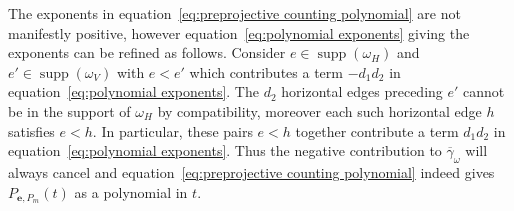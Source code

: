 \documentclass[ALCO,ThmDefs,Unicode,epreuves]{cedram}
\newcommand{\bfe}{\mathbf{e}}
\DeclareMathOperator{\supp}{supp}
\begin{document}
\begin{remark}
 The exponents in equation~\eqref{eq:preprojective counting polynomial} are not manifestly positive, however equation~\eqref{eq:polynomial exponents} giving the exponents can be refined as follows.
 Consider $e\in\supp(\omega_H)$ and $e'\in\supp(\omega_V)$ with $e<e'$ which contributes a term $-d_1d_2$ in equation~\eqref{eq:polynomial exponents}.
 The $d_2$ horizontal edges preceding $e'$ cannot be in the support of $\omega_H$ by compatibility, moreover each such horizontal edge $h$ satisfies $e<h$.
 In particular, these pairs $e<h$ together contribute a term $d_1d_2$ in equation~\eqref{eq:polynomial exponents}.
 Thus the negative contribution to $\overline{\gamma}_\omega$ will always cancel and equation~\eqref{eq:preprojective counting polynomial} indeed gives $P_{\bfe,P_m}(t)$ as a polynomial in $t$.
\end{remark}
 
 \nocite{*}
 
 
\end{document}

